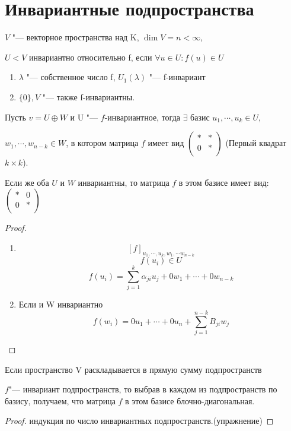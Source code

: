 \section{Инвариантные подпространства}
\begin{Def}

$V$ "--- векторное пространства над K, $\dim V = n < \infty$,

$U < V$ инвариантно относительно f, если  $\forall u \in U \colon f(u) \in U$

\end{Def}

\begin{exmp}
\begin{enumerate}
\item 
$\lambda$ "--- собственное число f, $U_1(\lambda)$ "--- f-инвариант

\item 
$\{0\}, V$ "--- также f-инвариантны. 
\end{enumerate}
\end{exmp} 

\begin{theorem}{}
Пусть $v = U \oplus W$ и U "--- $f$-инвариантное, тогда
$\exists$ базис $u_1, \cdots, u_k \in U$, 

$w_1, \cdots, w_{n - k} \in W$, в котором матрица $f$
имеет вид 
$\begin{pmatrix}
*&*\\
0&*\\
\end{pmatrix}$
(Первый квадрат $k \times k$).

Если же оба $U$ и $W$ инвариантны, то матрица $f$ в этом базисе имеет вид:
$
\begin{pmatrix}
*&0\\
0&*\\
\end{pmatrix}
$
\end{theorem}
\begin{proof}
\begin{enumerate}
    \item
     $$[f]_{u_1, \cdots,u_k, w_1, \cdots w_{n - k}}$$
     $$f(u_i) \in U$$
     $$f(u_i) = \sum_{j = 1}^{k} \alpha_{ji}u_j + 0w_1 + \cdots + 0w_{n - k}$$
     \item Если и W инвариантно
     $$f(w_i) = 0u_1 + \cdots + 0u_n + \sum_{j = 1}^{n - k}B_{ji}w_j$$
\end{enumerate}
\end{proof}
\begin{conseq}
Если пространство V раскладывается в прямую сумму подпространств

$f$"--- инвариант подпространств, то выбрав в каждом из
подпространств по базису, получаем, что матрица $f$ в этом
базисе блочно-диагональная.
\end{conseq}
\begin{proof}
индукция по число инвариантных подпространств.(упражнение)
\end{proof}

